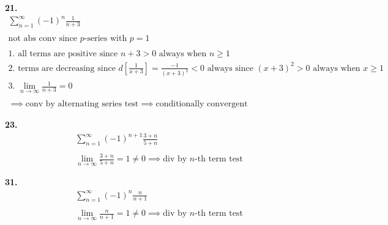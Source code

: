 \documentclass{article}
\begin{document}
\noindent
\textbf{21.}
\begin{gather*}
\sum_{n=1}^{\infty} (-1)^n \frac{1}{n+3}
\\
\\
\text{not abs conv since $p$-series with $p=1$}
\\
\\
\text{1. all terms are positive since } n+3 > 0 \text{~always when } n \geq 1
\\
\text{2. terms are decreasing since }
d \left[ \frac{1}{x+3} \right]
=\frac{-1}{(x+3)^2} < 0
\text{~always since } (x+3)^2>0 \text{~always when } x \geq 1
\\
\text{3. }
\lim_{n \to \infty} \frac{1}{n+3}=0
\\
\\
\implies
\text{conv by alternating series test}
\implies\text{conditionally convergent}
\end{gather*}



\noindent
\textbf{23.}
\begin{gather*}
\sum_{n=1}^{\infty} (-1)^{n+1} \frac{3+n}{5+n}
\\
\\
\lim_{n \to \infty} \frac{3+n}{5+n}=1 \neq 0 \implies \text{div by $n$-th term test}
\end{gather*}


\noindent
\textbf{31.}
\begin{gather*}
\sum_{n=1}^{\infty} (-1)^n \frac{n}{n+1}
\\
\\
\lim_{n \to \infty} \frac{n}{n+1}=1 \neq 0 \implies \text{div by $n$-th term test}
\end{gather*}
\end{document}
